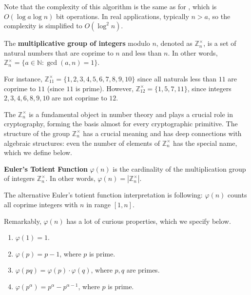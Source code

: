 \documentclass[../lecture-notes-148x210.tex]{subfiles}
\begin{document}
\begin{remark}
    Note that the complexity of this algorithm is the same as for
    , which is $O(\log a \log n)$ bit operations. In real 
    applications, typically $n>a$, so the complexity is simplified to $O(\log^2 n)$.
\end{remark}

\begin{definition}
    The \textbf{multiplicative group of integers} modulo $n$, denoted as $\mathbb{Z}_n^{\times}$, is a set of natural numbers that are coprime to $n$ and less than $n$. In other words, $\mathbb{Z}_n^{\times} = \{a \in \mathbb{N}: \gcd(a, n) = 1\}$.
\end{definition}

\begin{example}
    For instance, $\mathbb{Z}_{11}^{\times} = \{1, 2, 3, 4, 5, 6, 7, 8, 9, 10\}$
    since all naturals less than $11$ are coprime to $11$ (since $11$ is prime).
    However, $\mathbb{Z}_{12}^{\times} = \{1, 5, 7, 11\}$, since integers $2, 3,
    4, 6, 8, 9, 10$ are not coprime to $12$. 
\end{example}

The $\mathbb{Z}_{n}^{\times}$ is a fundamental object in number theory and plays
a crucial role in cryptography, forming the basis almost for every cryptographic
primitive. The structure of the group $\mathbb{Z}_{n}^{\times}$ has a crucial
meaning and has deep connections with algebraic structures: even the number of 
elements of $\mathbb{Z}_n^{\times}$ has the special name, which we define below.

\begin{definition} \label{def:euler_totient_function}
    \textbf{Euler's Totient Function} $\varphi(n)$ is the cardinality of the multiplication 
    group of integers $\mathbb{Z}_n^{\times}$. In other words, $\varphi(n) = |\mathbb{Z}_n^{\times}|$.
\end{definition}

\begin{remark}
    The alternative Euler's totient function interpretation is following:
    $\varphi(n)$ counts all coprime integers with $n$ in range $[1, n]$. 
\end{remark}

Remarkably, $\varphi(n)$ has a lot of curious properties, which we specify
below.

\begin{lemma}
    \hfill
    \begin{enumerate}
        \item $\varphi(1) = 1$.
        \item $\varphi(p) = p - 1$, where $p$ is prime.
        \item $\varphi(pq) = \varphi(p) \cdot \varphi(q)$, where $p, q$ are primes.
        \item $\varphi(p^{\alpha}) = p^{\alpha} - p^{\alpha - 1}$, where $p$ is prime.        
    \end{enumerate}    
\end{lemma}
\end{document}
